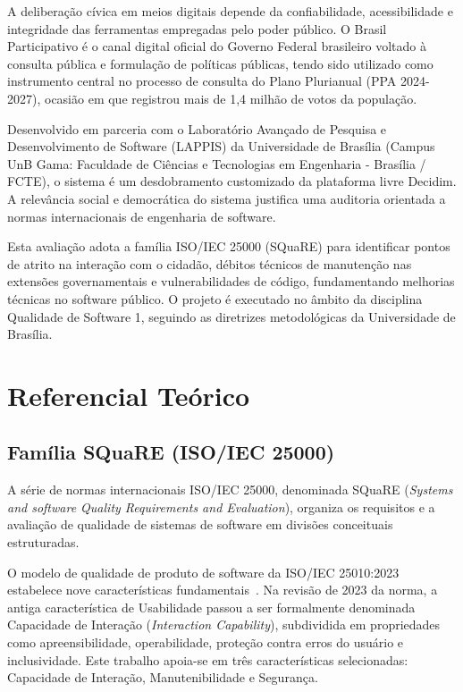 \documentclass[journal]{IEEEtran}
\begin{document}
A deliberação cívica em meios digitais depende da confiabilidade, acessibilidade e integridade das ferramentas empregadas pelo poder público. O Brasil Participativo é o canal digital oficial do Governo Federal brasileiro voltado à consulta pública e formulação de políticas públicas, tendo sido utilizado como instrumento central no processo de consulta do Plano Plurianual (PPA 2024-2027), ocasião em que registrou mais de 1,4 milhão de votos da população.

Desenvolvido em parceria com o Laboratório Avançado de Pesquisa e Desenvolvimento de Software (LAPPIS) da Universidade de Brasília (Campus UnB Gama: Faculdade de Ciências e Tecnologias em Engenharia - Brasília / FCTE), o sistema é um desdobramento customizado da plataforma livre Decidim. A relevância social e democrática do sistema justifica uma auditoria orientada a normas internacionais de engenharia de software. 

Esta avaliação adota a família ISO/IEC 25000 (SQuaRE) para identificar pontos de atrito na interação com o cidadão, débitos técnicos de manutenção nas extensões governamentais e vulnerabilidades de código, fundamentando melhorias técnicas no software público. O projeto é executado no âmbito da disciplina Qualidade de Software 1, seguindo as diretrizes metodológicas da Universidade de Brasília.

\section{Referencial Teórico}
\label{sec:referencial}

\subsection{Família SQuaRE (ISO/IEC 25000)}
\label{sec:square}

A série de normas internacionais ISO/IEC 25000, denominada SQuaRE (\textit{Systems and software Quality Requirements and Evaluation}), organiza os requisitos e a avaliação de qualidade de sistemas de software em divisões conceituais estruturadas. 

O modelo de qualidade de produto de software da ISO/IEC 25010:2023 estabelece nove características fundamentais~\cite{iso25010}. Na revisão de 2023 da norma, a antiga característica de Usabilidade passou a ser formalmente denominada Capacidade de Interação (\textit{Interaction Capability}), subdividida em propriedades como apreensibilidade, operabilidade, proteção contra erros do usuário e inclusividade. Este trabalho apoia-se em três características selecionadas: Capacidade de Interação, Manutenibilidade e Segurança.
\end{document}
